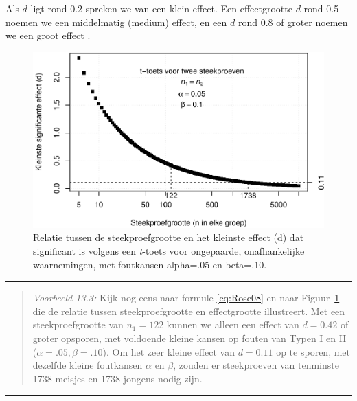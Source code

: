 \documentclass[
]{book}
\begin{document}
Als \(d\) ligt rond 0.2 spreken we van een klein effect. Een effectgrootte
\(d\) rond 0.5 noemen we een middelmatig (medium) effect, en een \(d\) rond
0.8 of groter noemen we een groot effect \citep{Cohen88, Rose08}.

\begin{figure}
\centering
\includegraphics{KMS-NL_files/figure-latex/kleinstesignifverschil-1.pdf}
\caption{\label{fig:kleinstesignifverschil}Relatie tussen de steekproefgrootte en het kleinste effect (d) dat significant is volgens een \emph{t}-toets voor ongepaarde, onafhankelijke waarnemingen, met foutkansen alpha=.05 en beta=.10.}
\end{figure}

\begin{center}\rule{0.5\linewidth}{0.5pt}\end{center}

\begin{quote}
\emph{Voorbeeld 13.3:}
Kijk nog eens naar formule
\eqref{eq:Rose08}
en naar Figuur~\ref{fig:kleinstesignifverschil} die de relatie tussen
steekproefgrootte en effectgrootte illustreert. Met een
steekproefgrootte van \(n_1=122\) kunnen we alleen een effect van \(d=0.42\)
of groter opsporen, met voldoende kleine kansen op fouten van Typen I en
II (\(\alpha=.05, \beta=.10\)). Om het zeer kleine effect van \(d=0.11\) op
te sporen, met dezelfde kleine foutkansen \(\alpha\) en \(\beta\), zouden er
steekproeven van tenminste 1738 meisjes en 1738 jongens nodig zijn.
\end{quote}

\begin{center}\rule{0.5\linewidth}{0.5pt}\end{center}
\end{document}
